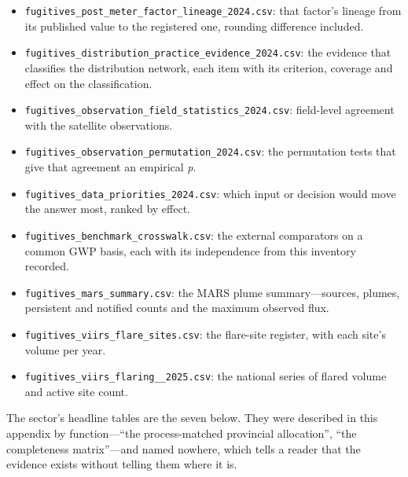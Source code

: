 \begin{itemize}
  use, with the IPCC inclusion decision for each.
\item \texttt{fugitives\_\allowbreak post\_\allowbreak meter\_\allowbreak factor\_\allowbreak lineage\_\allowbreak 2024.csv}: that factor's lineage
  from its published value to the registered one, rounding difference included.
\item \texttt{fugitives\_\allowbreak distribution\_\allowbreak practice\_\allowbreak evidence\_\allowbreak 2024.csv}: the evidence that
  classifies the distribution network, each item with its criterion, coverage and effect on the
  classification.
\item \texttt{fugitives\_\allowbreak observation\_\allowbreak field\_\allowbreak statistics\_\allowbreak 2024.csv}: field-level agreement
  with the satellite observations.
\item \texttt{fugitives\_\allowbreak observation\_\allowbreak permutation\_\allowbreak 2024.csv}: the permutation tests that
  give that agreement an empirical \emph{p}.
\item \texttt{fugitives\_data\_priorities\_2024.csv}: which input or decision would move
  the answer most, ranked by effect.
\item \texttt{fugitives\_benchmark\_crosswalk.csv}: the external comparators on a common
  GWP basis, each with its independence from this inventory recorded.
\item \texttt{fugitives\_mars\_summary.csv}: the MARS plume summary---sources, plumes,
  persistent and notified counts and the maximum observed flux.
\item \texttt{fugitives\_viirs\_flare\_sites.csv}: the flare-site register, with each
  site's volume per year.
\item \texttt{fugitives\_\allowbreak viirs\_\allowbreak flaring\_\_\allowbreak 2025.csv}: the national series of flared
  volume and active site count.
\end{itemize}

The sector's headline tables are the seven below. They were described in this appendix by
function---``the process-matched provincial allocation'', ``the completeness matrix''---and
named nowhere, which tells a reader that the evidence exists without telling them where it is.

